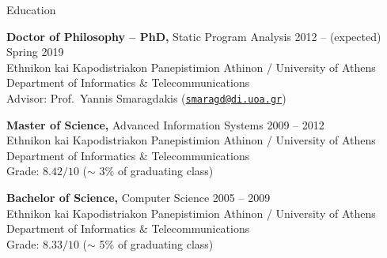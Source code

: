 \documentclass[a4paper]{resume}
\newcommand{\tl}{\textlatin}
\newcommand{\dual}[2]{\tl{#1}} %
\newcommand{\diFull}{\dual
{Ethnikon kai Kapodistriakon Panepistimion Athinon / University of Athens}
{Εθνικόν και Καποδιστριακόν Πανεπιστήμιον Αθηνών / Πανεπιστήμιο Αθηνών} \\
\dual
{Department of Informatics \& Telecommunications}
{Τμήμα Πληροφορικής \& Τηλεπικοινωνιών}}
\begin{document}
\newcommand{\mytilde}{\raise.17ex\hbox{$\scriptstyle\mathtt{\sim}$}}
\vspace{-1em}


\begin{rSection}{\dual{Education}{Εκπαιδευση}}

\dual
{{\bf Doctor of Philosophy -- PhD,} Static Program Analysis \hfill {2012 -- (expected) Spring 2019}}
{{\bf Διδακτορικό -- \tl{PhD},} Στατική Ανάλυση Προγραμμάτων \hfill {2012 -- (εκτιμάται) Άνοιξη 2019}} \\
\diFull \\
\dual{Advisor: Prof.~Yannis Smaragdakis}{Επιβλέπων Καθηγητής: Γιάννης Σμαραγδάκης}
(\href{mailto:smaragd@di.uoa.gr}{\tl{\nolinkurl{smaragd@di.uoa.gr}}}) %

\dual
{{\bf Master of Science,} Advanced Information Systems \hfill {2009 -- 2012}}
{{\bf Μεταπτυχιακό,} Προηγμένα Πληροφοριακά Συστήματα \hfill {2009 -- 2012}} \\
\diFull \\
\dual
{Grade: $8.42 / 10$ ($\sim$ 3\% of graduating class)}
{Μέσος Όρος: $8.42 / 10$ ($\sim$ 3\% της χρονιάς αποφοίτησης)}

\dual
{{\bf Bachelor of Science,} Computer Science \hfill {2005 -- 2009}}
{{\bf Πτυχίο,} Επιστήμη Υπολογιστών \hfill {2005 -- 2009}} \\
\diFull \\
\dual
{Grade: $8.33 / 10$ ($\sim$ 5\% of graduating class)}
{Μέσος Όρος: $8.33 / 10$ ($\sim$ 5\% της χρονιάς αποφοίτησης)}

\end{rSection}

\end{document}
